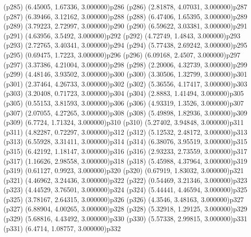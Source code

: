 \psdot(p285)
\psPoint(6.45005, 1.67336, 3.000000){p286}
\psdot(p286)
\psPoint(2.81878, 4.07031, 3.000000){p287}
\psdot(p287)
\psPoint(6.39466, 3.12162, 3.000000){p288}
\psdot(p288)
\psPoint(6.47406, 1.65395, 3.000000){p289}
\psdot(p289)
\psPoint(3.79223, 2.72997, 3.000000){p290}
\psdot(p290)
\psPoint(6.59622, 3.03381, 3.000000){p291}
\psdot(p291)
\psPoint(4.63956, 3.5492, 3.000000){p292}
\psdot(p292)
\psPoint(4.72749, 1.4843, 3.000000){p293}
\psdot(p293)
\psPoint(2.72765, 3.40341, 3.000000){p294}
\psdot(p294)
\psPoint(5.77438, 2.69242, 3.000000){p295}
\psdot(p295)
\psPoint(0.69475, 1.7223, 3.000000){p296}
\psdot(p296)
\psPoint(6.09168, 2.4507, 3.000000){p297}
\psdot(p297)
\psPoint(3.37386, 4.21004, 3.000000){p298}
\psdot(p298)
\psPoint(2.20006, 4.32739, 3.000000){p299}
\psdot(p299)
\psPoint(4.48146, 3.93502, 3.000000){p300}
\psdot(p300)
\psPoint(3.30506, 1.32799, 3.000000){p301}
\psdot(p301)
\psPoint(2.37464, 4.26733, 3.000000){p302}
\psdot(p302)
\psPoint(5.36556, 4.17417, 3.000000){p303}
\psdot(p303)
\psPoint(3.20408, 0.71723, 3.000000){p304}
\psdot(p304)
\psPoint(2.8883, 1.41494, 3.000000){p305}
\psdot(p305)
\psPoint(0.55153, 3.81593, 3.000000){p306}
\psdot(p306)
\psPoint(4.93319, 1.3526, 3.000000){p307}
\psdot(p307)
\psPoint(2.07055, 4.27265, 3.000000){p308}
\psdot(p308)
\psPoint(5.49898, 1.82936, 3.000000){p309}
\psdot(p309)
\psPoint(6.7724, 1.71324, 3.000000){p310}
\psdot(p310)
\psPoint(5.27402, 3.94848, 3.000000){p311}
\psdot(p311)
\psPoint(4.82287, 0.72297, 3.000000){p312}
\psdot(p312)
\psPoint(5.12532, 2.48172, 3.000000){p313}
\psdot(p313)
\psPoint(6.55928, 3.31411, 3.000000){p314}
\psdot(p314)
\psPoint(6.38076, 3.95519, 3.000000){p315}
\psdot(p315)
\psPoint(6.42192, 1.18147, 3.000000){p316}
\psdot(p316)
\psPoint(2.93233, 2.73559, 3.000000){p317}
\psdot(p317)
\psPoint(1.16626, 2.98558, 3.000000){p318}
\psdot(p318)
\psPoint(5.45988, 4.37964, 3.000000){p319}
\psdot(p319)
\psPoint(0.61127, 0.9923, 3.000000){p320}
\psdot(p320)
\psPoint(0.67919, 1.83032, 3.000000){p321}
\psdot(p321)
\psPoint(4.46962, 3.24436, 3.000000){p322}
\psdot(p322)
\psPoint(0.54469, 3.21346, 3.000000){p323}
\psdot(p323)
\psPoint(4.44529, 3.76501, 3.000000){p324}
\psdot(p324)
\psPoint(5.44441, 4.46594, 3.000000){p325}
\psdot(p325)
\psPoint(3.78167, 2.64315, 3.000000){p326}
\psdot(p326)
\psPoint(4.3546, 3.48163, 3.000000){p327}
\psdot(p327)
\psPoint(6.88904, 4.00265, 3.000000){p328}
\psdot(p328)
\psPoint(5.32918, 1.29125, 3.000000){p329}
\psdot(p329)
\psPoint(5.68816, 4.43492, 3.000000){p330}
\psdot(p330)
\psPoint(5.57338, 2.99815, 3.000000){p331}
\psdot(p331)
\psPoint(6.4714, 1.08757, 3.000000){p332}
